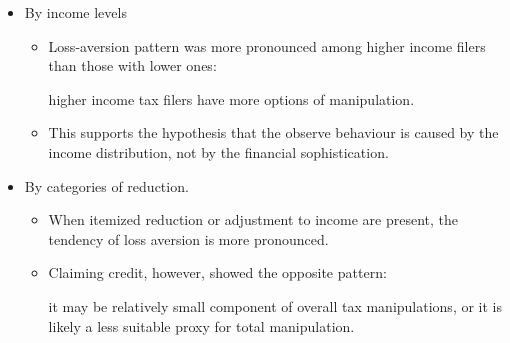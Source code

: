 \documentclass[dvipdfmx,12pt]{beamer}
\begin{document}
\begin{frame}
  \begin{itemize}
    \item By income levels
    \begin{itemize}
      \item Loss-aversion pattern was more pronounced among higher income
      filers than those with lower ones:

      higher income tax filers have more options of manipulation.

      \item This supports the hypothesis that the observe behaviour is
      caused by the income distribution, not by the financial sophistication.
    \end{itemize}

    \item By categories of reduction.

    \begin{itemize}
      \item When itemized reduction or adjustment to income are present, the tendency of loss aversion is more pronounced.

      \item Claiming credit, however, showed the opposite pattern:

      it may be relatively small component of overall tax manipulations,  or it is likely a less suitable proxy for total manipulation.
    \end{itemize}
  \end{itemize}
\end{frame}
\end{document}
